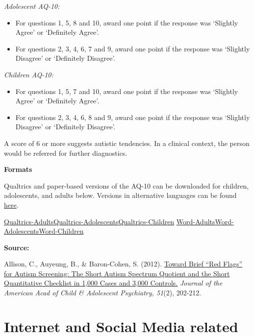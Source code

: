 \documentclass[
]{book}
\providecommand{\tightlist}{%
  \setlength{\itemsep}{0pt}\setlength{\parskip}{0pt}}
\begin{document}
\emph{Adolescent AQ-10:}

\begin{itemize}
\tightlist
\item
  For questions 1, 5, 8 and 10, award one point if the response was `Slightly Agree' or `Definitely Agree'.
\item
  For questions 2, 3, 4, 6, 7 and 9, award one point if the response was `Slightly Disagree' or `Definitely Disagree'.
\end{itemize}

\emph{Children AQ-10:}

\begin{itemize}
\tightlist
\item
  For questions 1, 5, 7 and 10, award one point if the response was `Slightly Agree' or `Definitely Agree'.
\item
  For questions 2, 3, 4, 6, 8 and 9, award one point if the response was `Slightly Disagree' or `Definitely Disagree'.
\end{itemize}

A score of 6 or more suggests autistic tendencies. In a clinical context, the person would be referred for further diagnostics.

\textbf{Formats}

Qualtrics and paper-based versions of the AQ-10 can be downloaded for children, adolescents, and adults below. Versions in alternative languages can be found \href{https://www.autismresearchcentre.com/arc_tests}{here}.

\href{link}{Qualtrics-Adults}\textbar{}\href{link}{Qualtrics-Adolescents}\textbar{}\href{link}{Qualtrics-Children}
\href{link}{Word-Adults}\textbar{}\href{link}{Word-Adolescents}\textbar{}\href{link}{Word-Children}

\textbf{Source:}

Allison, C., Auyeung, B., \& Baron-Cohen, S. (2012). \href{http://citeseerx.ist.psu.edu/viewdoc/download?doi=10.1.1.232.4537\&rep=rep1\&type=pdf}{Toward Brief ``Red Flags'' for Autism Screening: The Short Autism Spectrum Quotient and the Short Quantitative Checklist in 1,000 Cases and 3,000 Controls.} \emph{Journal of the American Acad of Child \& Adolescent Psychiatry, 51}(2), 202-212.

\hypertarget{internet-and-social-media-related}{%
\section{Internet and Social Media related}\label{internet-and-social-media-related}}
\end{document}
